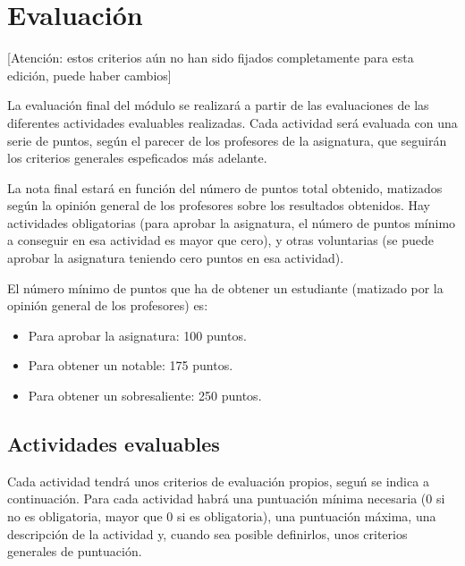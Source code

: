 \documentclass[a4paper,12pt]{article}
\begin{document}



\section{Evaluación}

[Atención: estos criterios aún no han sido fijados completamente para esta edición, puede haber cambios]

La evaluación final del módulo se realizará a partir de las evaluaciones de las diferentes actividades evaluables realizadas. Cada actividad será evaluada con una serie de puntos, según el parecer de los profesores de la asignatura, que seguirán los criterios generales espeficados más adelante.

La nota final estará en función del número de puntos total obtenido, matizados según la opinión general de los profesores sobre los resultados obtenidos. Hay actividades obligatorias (para aprobar la asignatura, el número de puntos mínimo a conseguir en esa actividad es mayor que cero), y otras voluntarias (se puede aprobar la asignatura teniendo cero puntos en esa actividad).

El número mínimo de puntos que ha de obtener un estudiante (matizado por la opinión general de los profesores) es:

\begin{itemize}
\item Para aprobar la asignatura: 100 puntos.
\item Para obtener un notable: 175 puntos.
\item Para obtener un sobresaliente: 250 puntos.
\end{itemize}

\subsection{Actividades evaluables}

Cada actividad tendrá unos criterios de evaluación propios, seguń se indica a continuación. Para cada actividad habrá una puntuación mínima necesaria (0 si no es obligatoria, mayor que 0 si es obligatoria), una puntuación máxima, una descripción de la actividad y, cuando sea posible definirlos, unos criterios generales de puntuación.
\end{document}
